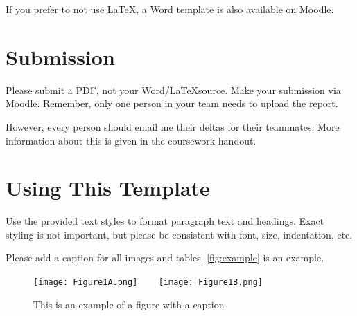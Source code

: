\documentclass[a4,10pt,twocolumn]{article}
\begin{document}
If you prefer to not use \LaTeX, a Word template is also available on Moodle.


\section*{Submission}

Please submit a PDF, not your Word/\LaTeX source. Make your submission via Moodle. Remember, only one person in your team needs to upload the report. 

However, every person should email me their deltas for their teammates. More information about this is given in the coursework handout.


\section*{Using This Template}

Use the provided text styles to format paragraph text and headings. Exact styling is not important, but please be consistent with font, size, indentation, etc.

Please add a caption for all images and tables. \autoref{fig:example} is an example.

\begin{figure}
	\centering
	\texttt{[image: Figure1A.png]}
	~~~
	\texttt{[image: Figure1B.png]}
	\caption{This is an example of a figure with a caption}
	\label{fig:example}
\end{figure}
\end{document}
